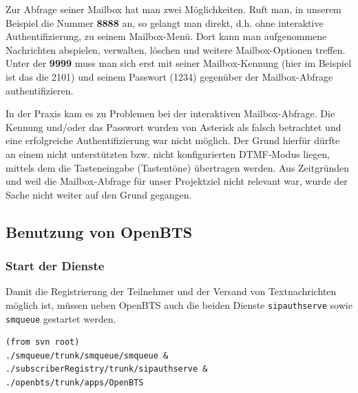 \begin{itemize}
\begin{enumerate}
Zur Abfrage seiner Mailbox hat man zwei Möglichkeiten. Ruft man, in unserem Beispiel die Nummer \textbf{8888} an, so gelangt man direkt, d.h. ohne interaktive Authentifizierung, zu seinem Mailbox-Menü. Dort kann man aufgenommene Nachrichten abspielen, verwalten, löschen und weitere Mailbox-Optionen treffen. Unter der \textbf{9999} muss man sich erst mit seiner Mailbox-Kennung (hier im Beispiel ist das die 2101) und seinem Passwort (1234) gegenüber der Mailbox-Abfrage authentifizieren.

In der Praxis kam es zu Problemen bei der interaktiven Mailbox-Abfrage. Die Kennung und/oder das Passwort wurden von Asterisk als falsch betrachtet und eine erfolgreiche Authentifizierung war nicht möglich. Der Grund hierfür dürfte an einem nicht unterstützten bzw. nicht konfigurierten DTMF-Modus liegen, mittels dem die Tasteneingabe (Tastentöne) übertragen werden. Aus Zeitgründen und weil die Mailbox-Abfrage für unser Projektziel nicht relevant war, wurde der Sache nicht weiter auf den Grund gegangen.
\end{enumerate}
\end{itemize} 

\subsection{Benutzung von OpenBTS}
\subsubsection{Start der Dienste}
Damit die Registrierung der Teilnehmer und der Versand von Textnachrichten möglich ist, müssen neben OpenBTS auch die beiden Dienste \verb|sipauthserve| sowie \verb|smqueue| gestartet werden.
\begin{verbatim}
(from svn root)
./smqueue/trunk/smqueue/smqueue &
./subscriberRegistry/trunk/sipauthserve &
./openbts/trunk/apps/OpenBTS
\end{verbatim}
